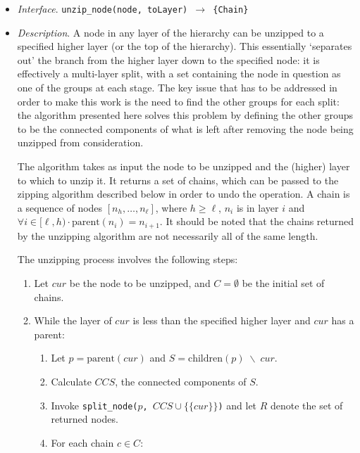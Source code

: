 \begin{itemize}

\item \emph{Interface}. \texttt{unzip_node(node, toLayer) $\rightarrow$ \{Chain\}}

\item \emph{Description}. A node in any layer of the hierarchy can be unzipped to a specified higher layer (or the top of the hierarchy). This essentially `separates out' the branch from the higher layer down to the specified node: it is effectively a multi-layer split, with a set containing the node in question as one of the groups at each stage. The key issue that has to be addressed in order to make this work is the need to find the other groups for each split: the algorithm presented here solves this problem by defining the other groups to be the connected components of what is left after removing the node being unzipped from consideration.

The algorithm takes as input the node to be unzipped and the (higher) layer to which to unzip it. It returns a set of chains, which can be passed to the zipping algorithm described below in order to undo the operation. A chain is a sequence of nodes $[n_h,\ldots,n_\ell]$, where $h \ge \ell$, $n_i$ is in layer $i$ and $\forall i \in [\ell,h) \cdot \mbox{parent}(n_i) = n_{i+1}$. It should be noted that the chains returned by the unzipping algorithm are not necessarily all of the same length.

The unzipping process involves the following steps:

\begin{enumerate}

\item Let $cur$ be the node to be unzipped, and $C = \emptyset$ be the initial set of chains.

\item While the layer of $cur$ is less than the specified higher layer and $cur$ has a parent:

\begin{enumerate}

\item Let $p = \mbox{parent}(cur)$ and $S = \mbox{children}(p) \; \backslash \; cur$.
\item Calculate $\textit{CCS}$, the connected components of $S$.
\item Invoke \texttt{split_node($p$, $\textit{CCS} \cup \{\{cur\}\}$)} and let $R$ denote the set of returned nodes.
\item For each chain $c \in C$:


\end{enumerate}
\end{enumerate}
\end{itemize}
